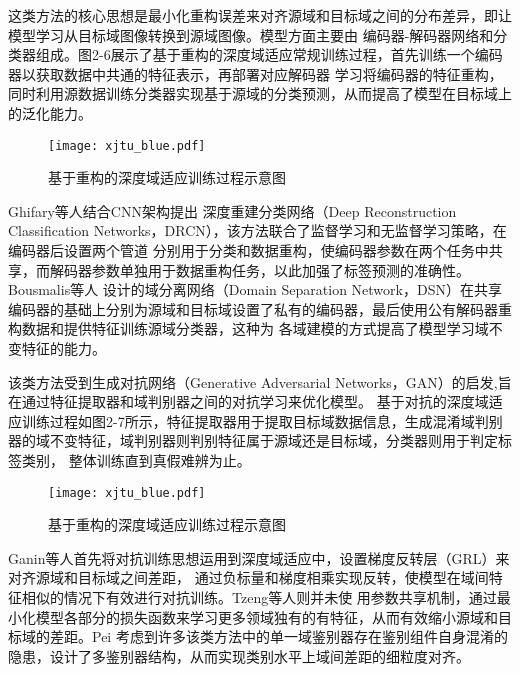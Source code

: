 这类方法的核心思想是最小化重构误差来对齐源域和目标域之间的分布差异，即让模型学习从目标域图像转换到源域图像。模型方面主要由
编码器-解码器网络和分类器组成。图2-6展示了基于重构的深度域适应常规训练过程，首先训练一个编码器以获取数据中共通的特征表示，再部署对应解码器
学习将编码器的特征重构，同时利用源数据训练分类器实现基于源域的分类预测，从而提高了模型在目标域上的泛化能力。
\begin{figure}[H]
    \centering
    \texttt{[image: xjtu\_blue.pdf]}
    \caption{基于重构的深度域适应训练过程示意图}
\end{figure}
Ghifary等人\cite{ghifary2016deep}结合CNN架构提出
深度重建分类网络（Deep Reconstruction Classification Networks，DRCN），该方法联合了监督学习和无监督学习策略，在编码器后设置两个管道
分别用于分类和数据重构，使编码器参数在两个任务中共享，而解码器参数单独用于数据重构任务，以此加强了标签预测的准确性。Bousmalis等人\cite{bousmalis2016domain}
设计的域分离网络（Domain Separation Network，DSN）在共享编码器的基础上分别为源域和目标域设置了私有的编码器，最后使用公有解码器重构数据和提供特征训练源域分类器，这种为
各域建模的方式提高了模型学习域不变特征的能力。

该类方法受到生成对抗网络（Generative Adversarial Networks，GAN）的启发,旨在通过特征提取器和域判别器之间的对抗学习来优化模型。
基于对抗的深度域适应训练过程如图2-7所示，特征提取器用于提取目标域数据信息，生成混淆域判别器的域不变特征，域判别器则判别特征属于源域还是目标域，分类器则用于判定标签类别，
整体训练直到真假难辨为止。
\begin{figure}[H]
    \centering
    \texttt{[image: xjtu\_blue.pdf]}
    \caption{基于重构的深度域适应训练过程示意图}
\end{figure}
Ganin等人\cite{ganin2015unsupervised}首先将对抗训练思想运用到深度域适应中，设置梯度反转层（GRL）来对齐源域和目标域之间差距，
通过负标量和梯度相乘实现反转，使模型在域间特征相似的情况下有效进行对抗训练。Tzeng等人\cite{tzeng2017adversarial}则并未使
用参数共享机制，通过最小化模型各部分的损失函数来学习更多领域独有的有特征，从而有效缩小源域和目标域的差距。Pei\cite{pei2018multi}
考虑到许多该类方法中的单一域鉴别器存在鉴别组件自身混淆的隐患，设计了多鉴别器结构，从而实现类别水平上域间差距的细粒度对齐。


